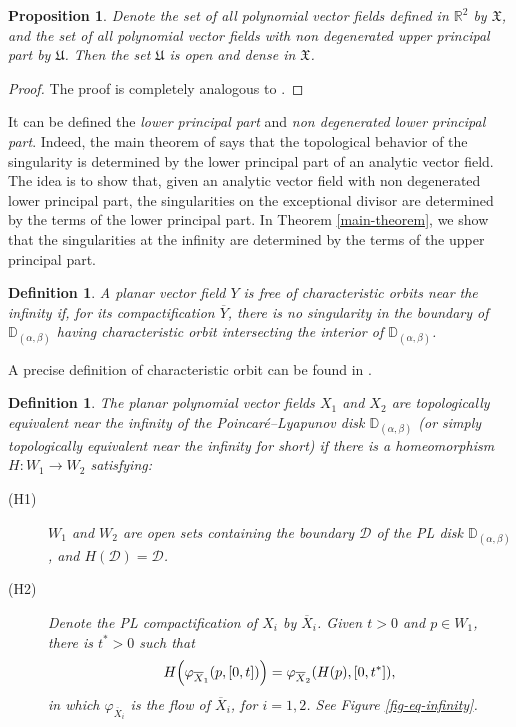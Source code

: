 \documentclass[12pt]{amsart}
\newtheorem{proposition}[theorem]{Proposition}
\newtheorem{definition}[theorem]{Definition}
\begin{document}
\begin{proposition}\label{prop-generic}
Denote the set of all polynomial vector fields defined in $\mathbb{R}^{2}$ by $\mathfrak{X}$, and the set of all polynomial vector fields with non degenerated upper principal part by $\mathfrak{U}$. Then the set $\mathfrak{U}$ is open and dense in $\mathfrak{X}$.
\end{proposition}

\begin{proof}
The proof is completely analogous to \cite[Proposition 6]{BrunellaMiari}.    
\end{proof}


It can be defined the \emph{lower principal part} and \emph{non degenerated lower principal part}. Indeed, the main theorem of \cite{Berezovskaya,BrunellaMiari} says that the topological behavior of the singularity is determined by the lower principal part of an analytic vector field. The idea is to show that, given an analytic vector field with non degenerated lower principal part, the singularities on the exceptional divisor are determined by the terms of the lower principal part. In Theorem \ref{main-theorem}, we show that the singularities at the infinity are determined by the terms of the upper principal part.

\begin{definition}
A planar vector field $Y$ is \emph{free of characteristic orbits near the infinity} if, for its compactification $\overline{Y}$, there is no singularity in the boundary of $\mathbb{D}_{(\alpha,\beta)}$ having characteristic orbit intersecting the interior of $\mathbb{D}_{(\alpha,\beta)}$.     
\end{definition}

A precise definition of characteristic orbit can be found in \cite[Definition 1.19]{Dumortier77}.

\begin{definition}\label{def-eq-infinity}
The planar polynomial vector fields $X_{1}$ and $X_{2}$ are \emph{topologically equivalent near the infinity of the Poincaré--Lyapunov disk $\mathbb{D}_{(\alpha,\beta)}$} (or simply topologically equivalent near the infinity for short) if there is a homeomorphism $H:W_{1}\rightarrow W_{2}$ satisfying:
\begin{description}
    \item[(H1)] $W_{1}$ and $W_{2}$ are open sets containing the boundary $\mathcal{D}$ of the PL disk $\mathbb{D}_{(\alpha,\beta)}$, and $H(\mathcal{D}) = \mathcal{D}$.
    \item[(H2)] Denote the PL compactification of $X_{i}$ by $\overline{X}_{i}$.  Given $t > 0$ and $p\in W_{1}$, there is $t^{*} > 0$ such that
    $$H\Big{(}\varphi_{\overline{X}_{1}}(p,[0,t])\Big{)} = \varphi_{\overline{X}_{2}}(H(p),[0,t^{*}]),$$
    in which $\varphi_{\overline{X}_{i}}$ is the flow of $\overline{X}_{i}$, for $i = 1,2$. See Figure \ref{fig-eq-infinity}.
\end{description}
\end{definition}
\end{document}
